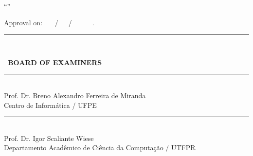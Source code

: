 
\thispagestyle{empty}
\begin{center}

    \textbf{{\ABNTEXchapterfont\fontsize{12}{12}\selectfont\imprimirautor}}
	
    \vspace{0.5cm}
    \begin{center}
      ``\ABNTEXchapterfont\fontsize{12}{12}\selectfont\imprimirtitulo''
    \end{center}
    \vspace{0.5cm}
	

      \hspace{.20\textwidth}
      \begin{minipage}{.55\textwidth}
      	\SingleSpacing
         \imprimirpreambuloatadefesa
       \end{minipage}%
       
    \vspace{0.5cm}
    \begin{flushleft}
    {\fontsize{12}{12}\selectfont Approval on: \_\_/\_\_/\_\_\_\_.}
    \vspace{0.5cm}
    \par\noindent\rule{0.6\textwidth}{0.4pt}\\
    {\bfseries\fontsize{12}{12}\selectfont\imprimirorientador\par}
    \end{flushleft}

     \vspace{1cm}
     
    {\bfseries\fontsize{12}{12}\selectfont\ BOARD OF EXAMINERS}
    
    \vspace{1cm}
    
        
		{\SingleSpacing
		\par\noindent\rule{0.6\textwidth}{0.4pt}\\
		Prof. Dr. Breno Alexandro Ferreira de Miranda\\
		Centro de Informática / UFPE}
        
        \vspace{0.2cm}
        {\SingleSpacing
		\par\noindent\rule{0.6\textwidth}{0.4pt}\\
		Prof. Dr. Igor Scaliante Wiese\\
		Departamento Acadêmico de Ciência da Computação / UTFPR}
		

\end{center}
